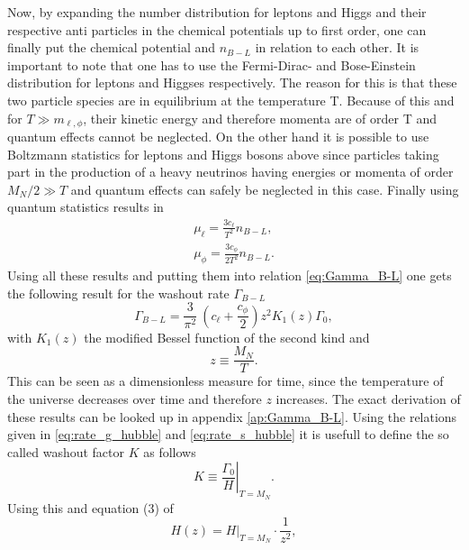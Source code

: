 Now, by expanding the number distribution for leptons and Higgs and their respective anti particles in the chemical potentials up to first order, one can finally put the chemical potential and $n_{B-L}$ in relation to each other. It is important to note that one has to use the Fermi-Dirac- and Bose-Einstein distribution for leptons and Higgses respectively. The reason for this is that these two particle species are in equilibrium at the temperature T. Because of this and for $T\gg m_{\ell,\phi}$, their kinetic energy and therefore momenta are of order T and quantum effects cannot be neglected. On the other hand it is possible to use Boltzmann statistics for leptons and Higgs bosons above since particles taking part in the production of a heavy neutrinos having energies or momenta of order $M_{N}/2\gg T$ and quantum effects can safely be neglected in this case. Finally using quantum statistics results in
\begin{align}
\mu_\ell=\frac{3c_\ell}{T^2}n_{B-L},
\label{eq:chempot_l}
\\
\mu_\phi=\frac{3c_\phi}{2T^2}n_{B-L}.
\label{eq:chempot_phi}
\end{align}
Using all these results and putting them into relation \eqref{eq:Gamma_B-L} one gets the following result for the washout rate $\Gamma_{B-L}$
\begin{equation}
	\Gamma_{B-L}=\frac{3}{\pi^2}\:\left(c_\ell+\frac{c_\phi}{2}\right)z^2K_1(z)\Gamma_0,
	\label{eq:Gamma_B-l_result}
\end{equation}
with $K_1(z)$ the modified Bessel function of the second kind and 
\begin{equation}
	z\equiv\frac{M_N}{T}.
\end{equation}
This can be seen as a dimensionless measure for time, since the temperature of the universe decreases over time and therefore $z$ increases. 
The exact derivation of these results can be looked up in appendix \ref{ap:Gamma_B-L}. \newline\indent
Using the relations given in \eqref{eq:rate_g_hubble} and \eqref{eq:rate_s_hubble} it is usefull to define the so called washout factor $K$ as follows
\begin{equation}
	K\equiv\left.\frac{\Gamma_0}{H}\right|_{T=M_N}.
	\label{eq:washout}
\end{equation}
Using this and equation (3) of \cite{Buchmuller:2004nz}
\begin{equation}
	H(z)=\left.H\right|_{T=M_N}\cdot \frac{1}{z^2},
	\label{eq:H_von_z}
\end{equation}
